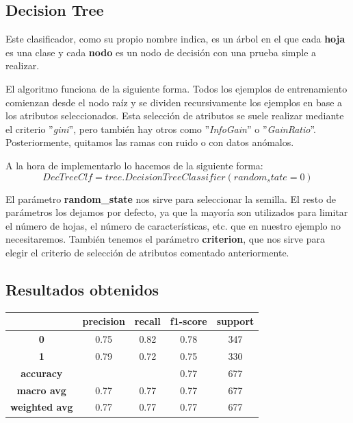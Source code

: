 \documentclass[11pt,a4paper]{article}
\begin{document}
\subsection{Decision Tree}
Este clasificador, como su propio nombre indica, es un árbol en el que cada \textbf{hoja} es una clase y cada \textbf{nodo} es
un nodo de decisión con una prueba simple a realizar.

El algoritmo funciona de la siguiente forma. Todos los ejemplos de entrenamiento comienzan desde el nodo raíz y se dividen
recursivamente los ejemplos en base a los atributos seleccionados. Esta selección de atributos se suele realizar mediante el
criterio ''\textit{gini}'', pero también hay otros como ''\textit{InfoGain}'' o ''\textit{GainRatio}''. Posteriormente,
quitamos las ramas con ruido o con datos anómalos.

A la hora de implementarlo lo hacemos de la siguiente forma:
$$DecTreeClf = tree.DecisionTreeClassifier(random_state=0)$$

El parámetro \textbf{random\_state} nos sirve para seleccionar la semilla. El resto de parámetros los dejamos por defecto, ya
que la mayoría son utilizados para limitar el número de hojas, el número de características, etc. que en nuestro ejemplo no
necesitaremos. También tenemos el parámetro \textbf{criterion}, que nos sirve para elegir el criterio de selección de atributos
comentado anteriormente.

\subsection*{Resultados obtenidos}
\begin{table}[H]
    \centering
    \begin{tabular}{c|cccc}
        \textbf{} & \textbf{precision} & \textbf{recall} & \textbf{f1-score} & \textbf{support} \\ \hline
        \textbf{0} & 0.75 & 0.82 & 0.78 & 347 \\
        \textbf{1} & 0.79 & 0.72 & 0.75 & 330 \\ \hline
        \textbf{accuracy} & & & 0.77 & 677  \\
        \textbf{macro avg} & 0.77 & 0.77 & 0.77 & 677 \\
        \textbf{weighted avg} & 0.77 & 0.77 & 0.77 & 677
    \end{tabular}
\end{table}
\end{document}
